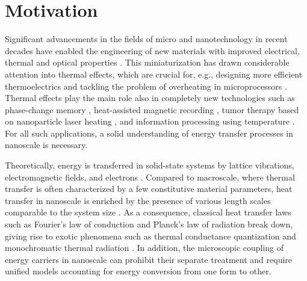 \label{chap:intro}
\section{Motivation}

Significant advancements in the fields of micro and nanotechnology in recent decades have enabled the engineering of new materials with improved electrical, thermal and optical properties \cite{}. This miniaturization has drawn considerable attention into thermal effects, which are crucial for, e.g., designing more efficient thermoelectrics \cite{vineis10,kanatzidis10,shakouri11} and tackling the problem of overheating in microprocessors \cite{pop06_ieee}. Thermal effects play the main role also in completely new technologies such as phase-change memory \cite{lankhorst05}, heat-assisted magnetic recording \cite{pan09}, tumor therapy based on nanoparticle laser heating \cite{avedisian09}, and information processing using temperature \cite{li12_rmp}. For all such applications, a solid understanding of energy transfer processes in nanoscale is necessary. %


Theoretically, energy is transferred in solid-state systems by lattice vibrations, electromagnetic fields, and electrons \cite{chen}. Compared to macroscale, where thermal transfer is often characterized by a few constitutive material parameters, heat transfer in nanoscale is enriched by the presence of various length scales comparable to the system size \cite{chen}. As a consequence, classical heat transfer laws such as Fourier's law of conduction \cite{fourier} and Planck's law of radiation \cite{planck00a} break down, giving rise to exotic phenomena such as thermal conductance quantization \cite{rego98,schwab00} and monochromatic thermal radiation \cite{carminati99,shchegrov00}. In addition, the microscopic coupling of energy carriers in nanoscale can prohibit their separate treatment and require unified models accounting for energy conversion from one form to other. 


